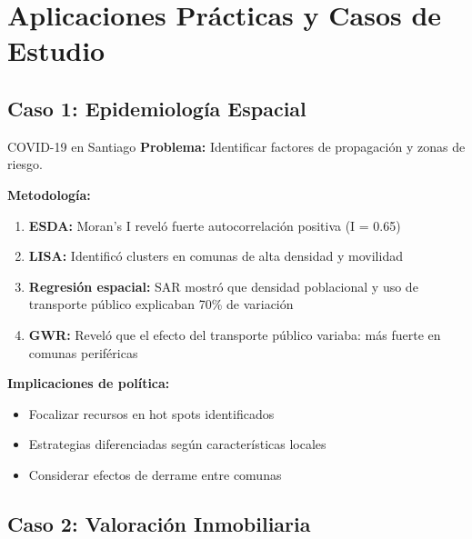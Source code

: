 \documentclass[12pt,a4paper]{article}
\begin{document}
\section{Aplicaciones Prácticas y Casos de Estudio}

\subsection{Caso 1: Epidemiología Espacial}

\begin{ejemplo}{COVID-19 en Santiago}
\textbf{Problema:} Identificar factores de propagación y zonas de riesgo.

\textbf{Metodología:}
\begin{enumerate}
    \item \textbf{ESDA:} Moran's I reveló fuerte autocorrelación positiva (I = 0.65)
    \item \textbf{LISA:} Identificó clusters en comunas de alta densidad y movilidad
    \item \textbf{Regresión espacial:} SAR mostró que densidad poblacional y uso de transporte público explicaban 70\% de variación
    \item \textbf{GWR:} Reveló que el efecto del transporte público variaba: más fuerte en comunas periféricas
\end{enumerate}

\textbf{Implicaciones de política:}
\begin{itemize}
    \item Focalizar recursos en hot spots identificados
    \item Estrategias diferenciadas según características locales
    \item Considerar efectos de derrame entre comunas
\end{itemize}
\end{ejemplo}

\subsection{Caso 2: Valoración Inmobiliaria}
\end{document}
